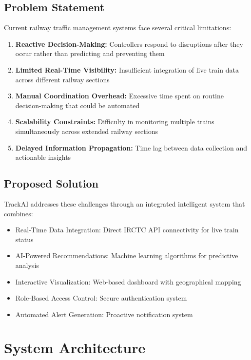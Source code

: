 \documentclass[12pt,a4paper]{article}
\begin{document}
\subsection{Problem Statement}

Current railway traffic management systems face several critical limitations:

\begin{enumerate}
    \item \textbf{Reactive Decision-Making:} Controllers respond to disruptions after they occur rather than predicting and preventing them
    \item \textbf{Limited Real-Time Visibility:} Insufficient integration of live train data across different railway sections
    \item \textbf{Manual Coordination Overhead:} Excessive time spent on routine decision-making that could be automated
    \item \textbf{Scalability Constraints:} Difficulty in monitoring multiple trains simultaneously across extended railway sections
    \item \textbf{Delayed Information Propagation:} Time lag between data collection and actionable insights
\end{enumerate}

\subsection{Proposed Solution}

TrackAI addresses these challenges through an integrated intelligent system that combines:

\begin{itemize}
    \item Real-Time Data Integration: Direct IRCTC API connectivity for live train status
    \item AI-Powered Recommendations: Machine learning algorithms for predictive analysis
    \item Interactive Visualization: Web-based dashboard with geographical mapping
    \item Role-Based Access Control: Secure authentication system
    \item Automated Alert Generation: Proactive notification system
\end{itemize}

\section{System Architecture}
\end{document}
